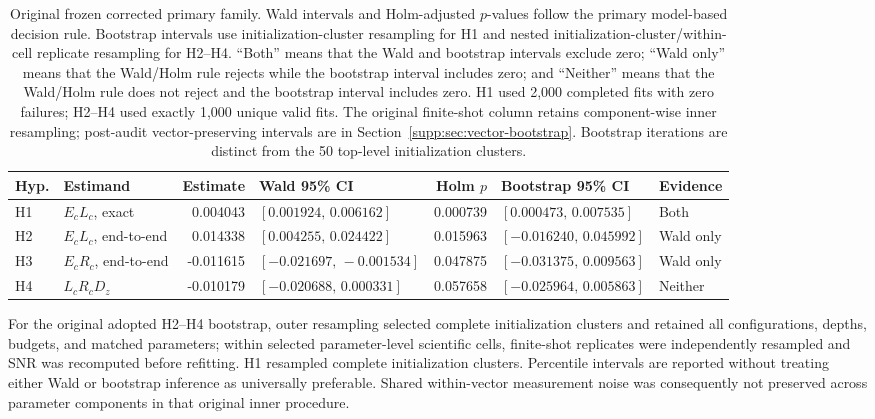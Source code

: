 \documentclass[pdflatex,sn-basic,Numbered]{sn-jnl}
\begin{document}
\begin{table}[t]
\centering
\footnotesize
\begin{tabularx}{\textwidth}{@{}l p{} r l r l >{\raggedright\arraybackslash}X@{}}
\toprule
Hyp. & Estimand & Estimate & Wald 95\% CI & Holm $p$ & Bootstrap 95\% CI & Evidence \\
\midrule
H1 & $E_cL_c$, exact
   & 0.004043
   & \mbox{$[0.001924,\,0.006162]$}
   & 0.000739
   & \mbox{$[0.000473,\,0.007535]$}
   & Both \\
H2 & $E_cL_c$, end-to-end
   & 0.014338
   & \mbox{$[0.004255,\,0.024422]$}
   & 0.015963
   & \mbox{$[-0.016240,\,0.045992]$}
   & Wald only \\
H3 & $E_cR_c$, end-to-end
   & -0.011615
   & \mbox{$[-0.021697,\,-0.001534]$}
   & 0.047875
   & \mbox{$[-0.031375,\,0.009563]$}
   & Wald only \\
H4 & $L_cR_cD_z$
   & -0.010179
   & \mbox{$[-0.020688,\,0.000331]$}
   & 0.057658
   & \mbox{$[-0.025964,\,0.005863]$}
   & Neither \\
\bottomrule
\end{tabularx}
\caption{Original frozen corrected primary family. Wald intervals and Holm-adjusted $p$-values follow the primary model-based decision rule. Bootstrap intervals use initialization-cluster resampling for H1 and nested initialization-cluster/within-cell replicate resampling for H2--H4. ``Both'' means that the Wald and bootstrap intervals exclude zero; ``Wald only'' means that the Wald/Holm rule rejects while the bootstrap interval includes zero; and ``Neither'' means that the Wald/Holm rule does not reject and the bootstrap interval includes zero. H1 used 2,000 completed fits with zero failures; H2--H4 used exactly 1,000 unique valid fits. The original finite-shot column retains component-wise inner resampling; post-audit vector-preserving intervals are in Section~\ref{supp:sec:vector-bootstrap}. Bootstrap iterations are distinct from the 50 top-level initialization clusters.}
\label{supp:tab:primary}
\end{table}

For the original adopted H2--H4 bootstrap, outer resampling selected complete initialization clusters and retained all configurations, depths, budgets, and matched parameters; within selected parameter-level scientific cells, finite-shot replicates were independently resampled and SNR was recomputed before refitting. H1 resampled complete initialization clusters. Percentile intervals are reported without treating either Wald or bootstrap inference as universally preferable. Shared within-vector measurement noise was consequently not preserved across parameter components in that original inner procedure.
\end{document}

